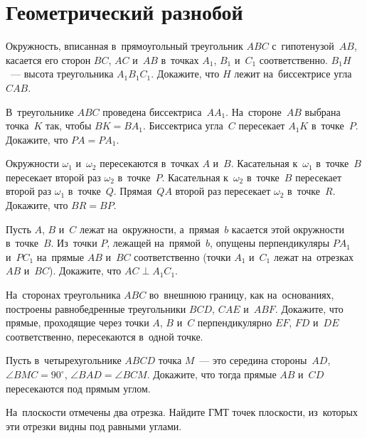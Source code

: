 
\section*{Геометрический разнобой}


\begin{problems}

\item
Окружность, вписанная в~прямоугольный треугольник $ABC$ с~гипотенузой~$AB$,
касается его сторон $BC$, $AC$ и~$AB$ в~точках $A_1$, $B_1$ и~$C_1$
соответственно.
$B_1 H$~--- высота треугольника $A_1 B_1 C_1$.
Докажите, что $H$ лежит на~биссектрисе угла $CAB$.

\item
В~треугольнике $ABC$ проведена биссектриса~$A A_1$.
На~стороне~$AB$ выбрана точка~$K$ так, чтобы $B K = B A_1$.
Биссектриса угла~$C$ пересекает $A_1 K$ в~точке~$P$.
Докажите, что $P A = P A_1$.

\item
Окружности $\omega_1$ и~$\omega_2$ пересекаются в~точках $A$ и~$B$.
Касательная к~$\omega_1$ в~точке~$B$ пересекает второй раз $\omega_2$
в~точке~$P$.
Касательная к~$\omega_2$ в~точке~$B$ пересекает второй раз $\omega_1$
в~точке~$Q$.
Прямая~$QA$ второй раз пересекает $\omega_2$ в~точке~$R$.
Докажите, что $BR = BP$.

\item
Пусть $A$, $B$ и~$C$ лежат на~окружности, а~прямая~$b$ касается этой окружности
в~точке~$B$.
Из~точки $P$, лежащей на~прямой~$b$, опущены перпендикуляры $P A_1$ и~$P C_1$
на~прямые $AB$ и~$BC$ соответственно (точки $A_1$ и~$C_1$ лежат на~отрезках
$AB$ и~$BC$).
Докажите, что $AC \perp A_1 C_1$.

\item
На~сторонах треугольника $ABC$ во~внешнюю границу, как на~основаниях, построены
равнобедренные треугольники $BCD$, $CAE$ и~$ABF$.
Докажите, что прямые, проходящие через точки $A$, $B$ и~$C$ перпендикулярно
$EF$, $FD$ и~$DE$ соответственно, пересекаются в~одной точке.

\item
Пусть в~четырехугольнике $ABCD$ точка $M$~--- это середина стороны~$AD$,
$\angle BMC = 90^{\circ}$, $\angle BAD = \angle BCM$.
Докажите, что тогда прямые $AB$ и~$CD$ пересекаются под прямым углом.

\item
На~плоскости отмечены два отрезка.
Найдите ГМТ точек плоскости, из~которых эти отрезки видны под равными углами.

\end{problems}

